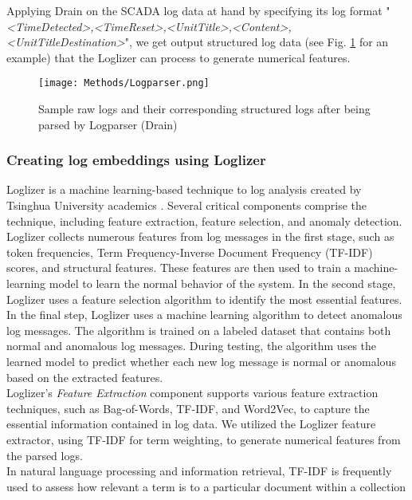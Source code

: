         Applying Drain on the SCADA log data at hand by specifying its log format "\emph{<TimeDetected>,<TimeReset>,<UnitTitle>,<Content>,<UnitTitleDestination>}", we get 
        output structured log data (see Fig. \ref{fig:logparser} for an example) that the Loglizer can process to generate numerical features.

      \begin{figure}[H]
        \begin{center}
          \texttt{[image: Methods/Logparser.png]}
        \end{center}
        \caption{Sample raw logs and their corresponding structured logs after being parsed by Logparser (Drain)}
        \label{fig:logparser}
      \end{figure}

      \subsubsection{Creating log embeddings using Loglizer}
        Loglizer is a machine learning-based technique to log analysis created by Tsinghua University academics \cite{Loglizer}. 
        Several critical components comprise the technique, including feature extraction, feature selection, and anomaly detection.
        Loglizer collects numerous features from log messages in the first stage, such as token frequencies, Term Frequency-Inverse Document Frequency (TF-IDF) scores, 
        and structural features. 
        These features are then used to train a machine-learning model to learn the normal behavior of the system.
        In the second stage, Loglizer uses a feature selection algorithm to identify the most essential features.
        In the final step, Loglizer uses a machine learning algorithm to detect anomalous log messages. 
        The algorithm is trained on a labeled dataset that contains both normal and anomalous log messages. 
        During testing, the algorithm uses the learned model to predict whether each new log message is normal or anomalous based on the extracted features.\\
        Loglizer's \emph{Feature Extraction} component supports various feature extraction techniques, such as Bag-of-Words, TF-IDF, and Word2Vec, 
        to capture the essential information contained in log data. We utilized the Loglizer feature extractor, using TF-IDF \cite{TF-IDF} for term weighting, to generate numerical 
        features from the parsed logs.\\
        In natural language processing and information retrieval, TF-IDF is frequently used to assess how relevant a term is to a particular document within a collection 

